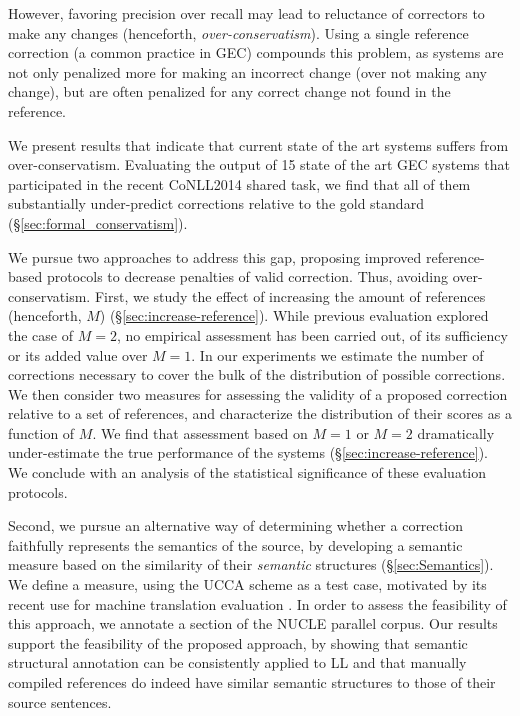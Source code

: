 \documentclass[letter,11pt]{article}
\begin{document}
However, favoring precision over recall may lead to reluctance of correctors to make any changes (henceforth, {\it over-conservatism}).
Using a single reference correction (a common practice in GEC) compounds this problem,
as systems are not only penalized more for making an incorrect change (over not making
any change), but are often penalized for any correct change not found in the reference.

We present results that indicate that current state of the art systems suffers
from over-conservatism. Evaluating the output of 15 state
of the art GEC systems that participated
in the recent CoNLL2014 shared task, we find that all of them
substantially under-predict corrections relative to the gold standard
(\S\ref{sec:formal_conservatism}). 

We pursue two approaches to address this gap, proposing
improved reference-based protocols to decrease penalties of valid correction. Thus, avoiding over-conservatism.
First, we study the effect of increasing the amount of references
(henceforth, $M$) (\S\ref{sec:increase-reference}).
While previous evaluation explored the case of $M=2$,
no empirical assessment has been carried out, of its sufficiency
or its added value over $M=1$.
In our experiments we estimate the number of corrections necessary
to cover the bulk of the distribution of possible corrections.
We then consider two measures for
assessing the validity of a proposed correction relative to a set of references,
and characterize the distribution of their scores as a function of $M$.
We find that assessment based on $M=1$ or $M=2$ dramatically under-estimate
the true performance of the systems (\S\ref{sec:increase-reference}). 
We conclude with an analysis of
the statistical significance of these evaluation protocols.

Second, we pursue an alternative way of determining whether a correction faithfully
represents the semantics of the source, by developing a semantic measure based
on the similarity of their {\it semantic} structures (\S\ref{sec:Semantics}).
We define a measure, using the UCCA scheme \cite{abend2013universal} as a
test case, motivated by its recent use for machine translation
evaluation \cite{birch2016hume}.
In order to assess the feasibility of this approach, we annotate a
section of the NUCLE \cite{dahlmeier2013building}
parallel corpus. Our results support the feasibility of the proposed approach,
by showing that semantic structural annotation can be consistently applied
to LL and that manually compiled references do indeed
have similar semantic structures to those of their source sentences.
\end{document}
